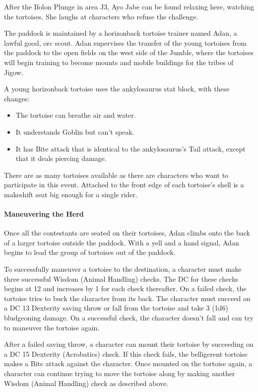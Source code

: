 \documentclass[10pt,a4paper,twoside,bg=print,twocolumn,openany,nodeprecatedcode]{dndbook}
\begin{document}
After the Ifolon Plunge in area J3, Ayo Jabe can be found relaxing here, watching the tortoises. She laughs at characters who refuse the challenge.

The paddock is maintained by a horizonback tortoise trainer named Adan, a lawful good, orc scout. Adan supervises the transfer of the young tortoises from the paddock to the open fields on the west side of the Jumble, where the tortoises will begin training to become mounts and mobile buildings for the tribes of Jigow.

A young horizonback tortoise uses the ankylosaurus stat block, with these changes:


\begin{itemize}
\item The tortoise can breathe air and water.
\item It understands Goblin but can't speak.
\item It has Bite attack that is identical to the ankylosaurus's Tail attack, except that it deals piercing damage.
\end{itemize}

There are as many tortoises available as there are characters who want to participate in this event. Attached to the front edge of each tortoise's shell is a makeshift seat big enough for a single rider.

\paragraph{Maneuvering the Herd}
Once all the contestants are seated on their tortoises, Adan climbs onto the back of a larger tortoise outside the paddock. With a yell and a hand signal, Adan begins to lead the group of tortoises out of the paddock.

To successfully maneuver a tortoise to the destination, a character must make three successful Wisdom (Animal Handling) checks. The DC for these checks begins at 12 and increases by 1 for each check thereafter. On a failed check, the tortoise tries to buck the character from its back. The character must succeed on a DC 13 Dexterity saving throw or fall from the tortoise and take 3 (1d6) bludgeoning damage. On a successful check, the character doesn't fall and can try to maneuver the tortoise again.

After a failed saving throw, a character can mount their tortoise by succeeding on a DC 15 Dexterity (Acrobatics) check. If this check fails, the belligerent tortoise makes a Bite attack against the character. Once mounted on the tortoise again, a character can continue trying to move the tortoise along by making another Wisdom (Animal Handling) check as described above.
\end{document}
